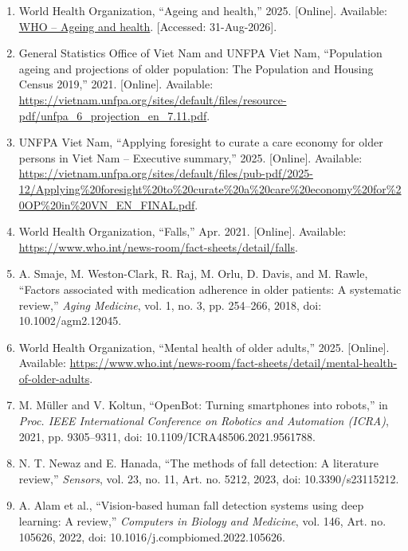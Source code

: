 
\begin{enumerate}
    \item \label{ref:who_ageing} World Health Organization, ``Ageing and health,'' 2025. [Online]. Available: \href{https://www.who.int/news-room/fact-sheets/detail/ageing-and-health}{WHO -- Ageing and health}. [Accessed: 31-Aug-2026].
    \item \label{ref:gso_unfpa_ageing} General Statistics Office of Viet Nam and UNFPA Viet Nam, ``Population ageing and projections of older population: The Population and Housing Census 2019,'' 2021. [Online]. Available: \url{https://vietnam.unfpa.org/sites/default/files/resource-pdf/unfpa_6_projection_en_7.11.pdf}.
    \item \label{ref:unfpa_care_economy} UNFPA Viet Nam, ``Applying foresight to curate a care economy for older persons in Viet Nam -- Executive summary,'' 2025. [Online]. Available: \url{https://vietnam.unfpa.org/sites/default/files/pub-pdf/2025-12/Applying%20foresight%20to%20curate%20a%20care%20economy%20for%20OP%20in%20VN_EN_FINAL.pdf}.
    \item \label{ref:who_falls} World Health Organization, ``Falls,'' Apr. 2021. [Online]. Available: \url{https://www.who.int/news-room/fact-sheets/detail/falls}.
    \item \label{ref:med_adherence} A. Smaje, M. Weston-Clark, R. Raj, M. Orlu, D. Davis, and M. Rawle, ``Factors associated with medication adherence in older patients: A systematic review,'' \textit{Aging Medicine}, vol. 1, no. 3, pp. 254--266, 2018, doi: 10.1002/agm2.12045.
    \item \label{ref:who_mental_health} World Health Organization, ``Mental health of older adults,'' 2025. [Online]. Available: \url{https://www.who.int/news-room/fact-sheets/detail/mental-health-of-older-adults}.
    \item \label{ref:openbot} M. Müller and V. Koltun, ``OpenBot: Turning smartphones into robots,'' in \textit{Proc. IEEE International Conference on Robotics and Automation (ICRA)}, 2021, pp. 9305--9311, doi: 10.1109/ICRA48506.2021.9561788.
    \item \label{ref:newaz_fall_review} N. T. Newaz and E. Hanada, ``The methods of fall detection: A literature review,'' \textit{Sensors}, vol. 23, no. 11, Art. no. 5212, 2023, doi: 10.3390/s23115212.
    \item \label{ref:fall_review} A. Alam et al., ``Vision-based human fall detection systems using deep learning: A review,'' \textit{Computers in Biology and Medicine}, vol. 146, Art. no. 105626, 2022, doi: 10.1016/j.compbiomed.2022.105626.

\end{enumerate}
